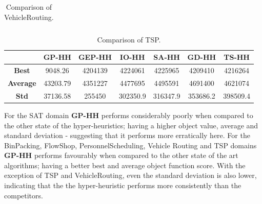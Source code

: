 \documentclass[a4paper,12pt]{article}
\begin{document}
{\begin{table}[h!]
\begin{tabular}{| c | c | c | c | c| c| c|}
                    \hline
                \end{tabular}
                \caption{Comparison of VehicleRouting.} 
        \end{table} 
        \begin{table}[h!] 
                \small 
                \centering
                \begin{tabular}{| c | c | c | c | c| c| c|} 
                    \hline   
                    &\textbf{GP-HH} & \textbf{GEP-HH} & \textbf{IO-HH} & \textbf{SA-HH} & \textbf{GD-HH} & \textbf{TS-HH} \\
                    \hline
                    \textbf{Best} & 9048.26 & 4204139 & 4224061& 4225965& 4209410& 4216264\\
                    \hline
                    \textbf{Average} & 43203.79 & 4351227 & 4477695 & 4495591& 4691400& 4621074\\
                    \hline
                    \textbf{Std} & 37136.58 & 255450 & 302350.9& 316347.9 & 353686.2 & 398509.4\\
                    \hline
                \end{tabular}
                \caption{Comparison of TSP.} 
        \end{table} 
        \noindent For the SAT domain \textbf{GP-HH} performs considerably poorly when compared to the other state of the hyper-heuristics; having a 
        higher object value, average and standard deviation - suggesting that it performs more erratically here. \newline 
        \newline 
        For the BinPacking, FlowShop, PersonnelScheduling, Vehicle Routing and TSP domains \textbf{GP-HH} performs favourably when compared to the other state of the art algorithms; having a better best and average object 
        function score. With the exception of TSP and VehicleRouting, even the standard deviation is also lower, indicating that the the hyper-heuristic
        performs more consistently than the competitors.
    }
\newpage
\end{document}
